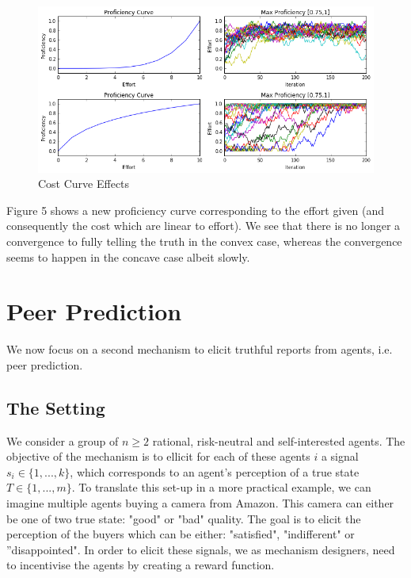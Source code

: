 \documentclass{scrartcl}
\begin{document}
 \begin{figure}[H]
	\caption{Cost Curve Effects}
	\centering
	\includegraphics[width=1.0\textwidth]{cost_curves}
\end{figure}

Figure 5 shows a new proficiency curve corresponding to the effort given (and consequently the cost which are linear to effort). We see that there is no longer a convergence to fully telling the truth in the convex case, whereas the convergence seems to happen in the concave case albeit slowly.

\section{Peer Prediction}

We now focus on a second mechanism to elicit truthful reports from agents, i.e. peer prediction. 

\subsection{The Setting}

We consider a group of $n\geq2$ rational, risk-neutral and self-interested agents. The objective of the mechanism is to ellicit for each of these agents $i$ a signal $s_i \in \{1,..., k\}$, which corresponds to an agent's perception of a true state $T \in \{1, ..., m\}$. To translate this set-up in a more practical example, we can imagine multiple agents buying a camera from Amazon. This camera can either be one of two true state: "good" or "bad" quality. The goal is to elicit the perception of the buyers which can be either: "satisfied", "indifferent" or ''disappointed". In order to elicit these signals, we as mechanism designers, need to incentivise the agents by creating a reward function.\\
\end{document}

